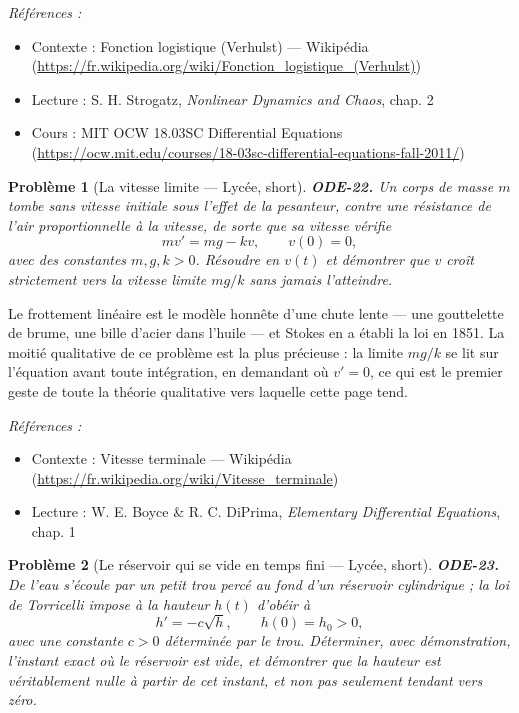 \documentclass[11pt]{article}
\newtheorem{problem}{Problème}
\newenvironment{refs}{\par\small\noindent\emph{Références :}\begin{itemize}\setlength\itemsep{0pt}}{\end{itemize}\normalsize}
\begin{document}
\begin{refs}
\item Contexte : Fonction logistique (Verhulst) --- Wikipédia (\url{https://fr.wikipedia.org/wiki/Fonction_logistique_(Verhulst)})
\item Lecture : S. H. Strogatz, \textit{Nonlinear Dynamics and Chaos}, chap. 2
\item Cours : MIT OCW 18.03SC Differential Equations (\url{https://ocw.mit.edu/courses/18-03sc-differential-equations-fall-2011/})
\end{refs}

\bigskip

\begin{problem}[{La vitesse limite --- Lycée, short}]
\textbf{ODE-22.} Un corps de masse $ m $ tombe sans vitesse initiale sous
l'effet de la pesanteur, contre une résistance de l'air proportionnelle à la vitesse, de sorte
que sa vitesse vérifie
\[ m v' = mg - k v, \qquad v(0) = 0, \]
avec des constantes $ m, g, k >0 $. Résoudre en $ v(t) $ et démontrer que $ v $ croît
strictement vers la vitesse limite $ mg/k $ sans jamais l'atteindre.
\end{problem}

\noindent Le frottement linéaire est le modèle honnête d'une chute lente --- une
gouttelette de brume, une bille d'acier dans l'huile --- et Stokes en a établi la loi en 1851. La
moitié qualitative de ce problème est la plus précieuse : la limite $ mg/k $ se lit sur
l'équation avant toute intégration, en demandant où $ v' = 0 $, ce qui est le premier geste de
toute la théorie qualitative vers laquelle cette page tend.

\begin{refs}
\item Contexte : Vitesse terminale --- Wikipédia (\url{https://fr.wikipedia.org/wiki/Vitesse_terminale})
\item Lecture : W. E. Boyce \& R. C. DiPrima, \textit{Elementary Differential Equations}, chap. 1
\end{refs}

\bigskip

\begin{problem}[{Le réservoir qui se vide en temps fini --- Lycée, short}]
\textbf{ODE-23.} De l'eau s'écoule par un petit trou percé au fond d'un
réservoir cylindrique ; la loi de Torricelli impose à la hauteur $ h(t) $ d'obéir à
\[ h' = -c\sqrt{h}, \qquad h(0) = h_0 >0, \]
avec une constante $ c >0 $ déterminée par le trou. Déterminer, avec démonstration, l'instant
exact où le réservoir est vide, et démontrer que la hauteur est véritablement nulle à partir de
cet instant, et non pas seulement tendant vers zéro.
\end{problem}
\end{document}
